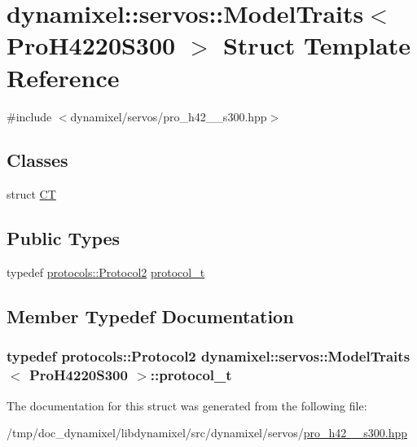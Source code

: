 \hypertarget{structdynamixel_1_1servos_1_1_model_traits_3_01_pro_h4220_s300_01_4}{}\section{dynamixel\+:\+:servos\+:\+:Model\+Traits$<$ Pro\+H4220\+S300 $>$ Struct Template Reference}
\label{structdynamixel_1_1servos_1_1_model_traits_3_01_pro_h4220_s300_01_4}


{\ttfamily \#include $<$dynamixel/servos/pro\+\_\+h42\+\_\+\_\+s300.\+hpp$>$}

\subsection*{Classes}
\begin{DoxyCompactItemize}
\item 
struct \hyperlink{structdynamixel_1_1servos_1_1_model_traits_3_01_pro_h4220_s300_01_4_1_1_c_t}{CT}
\end{DoxyCompactItemize}
\subsection*{Public Types}
\begin{DoxyCompactItemize}
\item 
typedef \hyperlink{classdynamixel_1_1protocols_1_1_protocol2}{protocols\+::\+Protocol2} \hyperlink{structdynamixel_1_1servos_1_1_model_traits_3_01_pro_h4220_s300_01_4_af0a83d7ff1740d0a0c61f653d1c48f45}{protocol\+\_\+t}
\end{DoxyCompactItemize}


\subsection{Member Typedef Documentation}
\subsubsection[{\texorpdfstring{protocol\+\_\+t}{protocol_t}}]{\setlength{\rightskip}{0pt plus 5cm}typedef {\bf protocols\+::\+Protocol2} {\bf dynamixel\+::servos\+::\+Model\+Traits}$<$ {\bf Pro\+H4220\+S300} $>$\+::{\bf protocol\+\_\+t}}\hypertarget{structdynamixel_1_1servos_1_1_model_traits_3_01_pro_h4220_s300_01_4_af0a83d7ff1740d0a0c61f653d1c48f45}{}\label{structdynamixel_1_1servos_1_1_model_traits_3_01_pro_h4220_s300_01_4_af0a83d7ff1740d0a0c61f653d1c48f45}


The documentation for this struct was generated from the following file\+:\begin{DoxyCompactItemize}
\item 
/tmp/doc\+\_\+dynamixel/libdynamixel/src/dynamixel/servos/\hyperlink{pro__h42__20__s300_8hpp}{pro\+\_\+h42\+\_\+\_\+s300.\+hpp}\end{DoxyCompactItemize}
